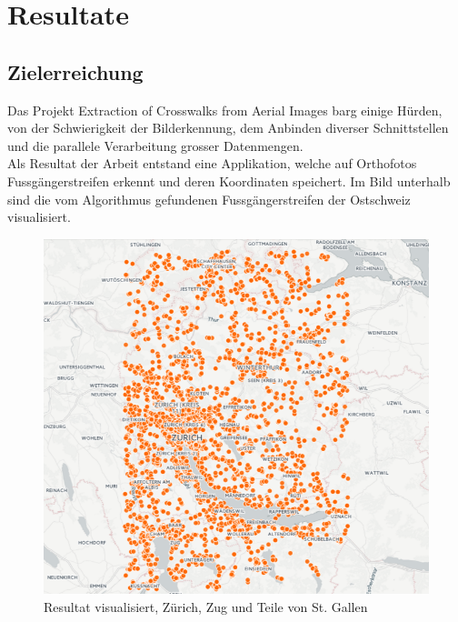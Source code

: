 \newpage
\section{Resultate}
\subsection{Zielerreichung}
Das Projekt Extraction of Crosswalks from Aerial Images barg einige Hürden, von der Schwierigkeit der Bilderkennung, dem Anbinden diverser Schnittstellen und die parallele Verarbeitung grosser Datenmengen.\\
Als Resultat der Arbeit entstand eine Applikation, welche auf Orthofotos Fussgängerstreifen erkennt und deren Koordinaten speichert. Im Bild unterhalb sind die vom Algorithmus gefundenen Fussgängerstreifen der Ostschweiz visualisiert. \\
\begin{figure}[H]
\centering
\includegraphics[width=350pt]{images/result_points.png}
\caption[Resultat visualisiert]{Resultat visualisiert, Zürich, Zug und Teile von St. Gallen}
\end{figure}
\newpage
